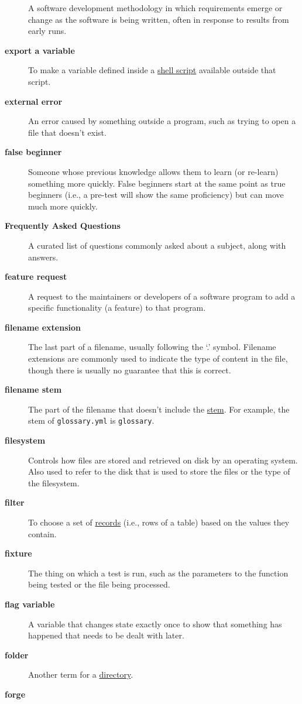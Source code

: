 \documentclass[
]{krantz}
\begin{document}
\begin{description}
A software development methodology in which requirements emerge or change as the software is being written, often in response to results from early runs.
\item[\textbf{export a variable}]
To make a variable defined inside a \protect\hyperlink{shell_script}{shell script} available outside that script.
\item[\textbf{external error}]
An error caused by something outside a program, such as trying to open a file that doesn't exist.
\item[\textbf{false beginner}]
Someone whose previous knowledge allows them to learn (or re-learn) something more quickly. False beginners start at the same point as true beginners (i.e., a pre-test will show the same proficiency) but can move much more quickly.
\item[\textbf{Frequently Asked Questions}]
A curated list of questions commonly asked about a subject, along with answers.
\item[\textbf{feature request}]
A request to the maintainers or developers of a software program to add a specific functionality (a feature) to that program.
\item[\textbf{filename extension}]
The last part of a filename, usually following the `.' symbol. Filename extensions are commonly used to indicate the type of content in the file, though there is usually no guarantee that this is correct.
\item[\textbf{filename stem}]
The part of the filename that doesn't include the \protect\hyperlink{filename_stem}{stem}. For example, the stem of \texttt{glossary.yml} is \texttt{glossary}.
\item[\textbf{filesystem}]
Controls how files are stored and retrieved on disk by an operating system. Also used to refer to the disk that is used to store the files or the type of the filesystem.
\item[\textbf{filter}]
To choose a set of \protect\hyperlink{record}{records} (i.e., rows of a table) based on the values they contain.
\item[\textbf{fixture}]
The thing on which a test is run, such as the parameters to the function being tested or the file being processed.
\item[\textbf{flag variable}]
A variable that changes state exactly once to show that something has happened that needs to be dealt with later.
\item[\textbf{folder}]
Another term for a \protect\hyperlink{directory}{directory}.
\item[\textbf{forge}]

\end{description}
\end{document}
